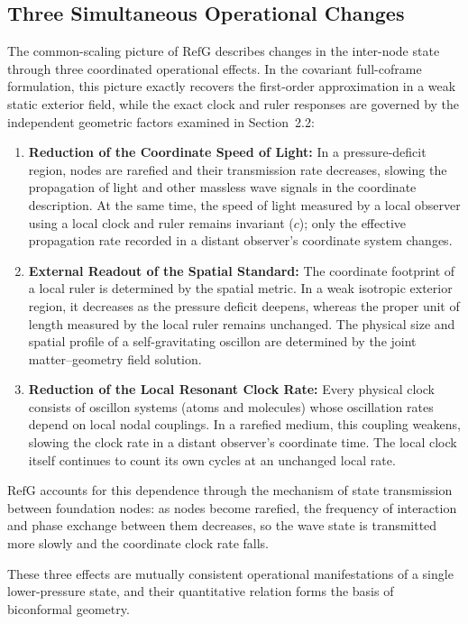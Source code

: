 \documentclass[11pt,a4paper]{article}
\newcommand{\RefG}{\mathrm{RefG}}
\begin{document}
\subsection{Three Simultaneous Operational Changes}

The common-scaling picture of $\RefG$ describes changes in the inter-node state through three coordinated operational effects. In the covariant full-coframe formulation, this picture exactly recovers the first-order approximation in a weak static exterior field, while the exact clock and ruler responses are governed by the independent geometric factors examined in Section~2.2:
\begin{enumerate}[label=\arabic*.]
\item \textbf{Reduction of the Coordinate Speed of Light:} In a pressure-deficit region, nodes are rarefied and their transmission rate decreases, slowing the propagation of light and other massless wave signals in the coordinate description. At the same time, the speed of light measured by a local observer using a local clock and ruler remains invariant ($c$); only the effective propagation rate recorded in a distant observer's coordinate system changes.
\item \textbf{External Readout of the Spatial Standard:} The coordinate footprint of a local ruler is determined by the spatial metric. In a weak isotropic exterior region, it decreases as the pressure deficit deepens, whereas the proper unit of length measured by the local ruler remains unchanged. The physical size and spatial profile of a self-gravitating oscillon are determined by the joint matter--geometry field solution.
\item \textbf{Reduction of the Local Resonant Clock Rate:} Every physical clock consists of oscillon systems (atoms and molecules) whose oscillation rates depend on local nodal couplings. In a rarefied medium, this coupling weakens, slowing the clock rate in a distant observer's coordinate time. The local clock itself continues to count its own cycles at an unchanged local rate.
\end{enumerate}

$\RefG$ accounts for this dependence through the mechanism of state transmission between foundation nodes: as nodes become rarefied, the frequency of interaction and phase exchange between them decreases, so the wave state is transmitted more slowly and the coordinate clock rate falls.

These three effects are mutually consistent operational manifestations of a single lower-pressure state, and their quantitative relation forms the basis of biconformal geometry.
\end{document}
